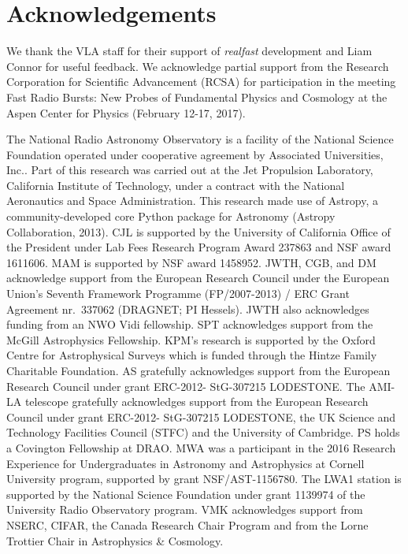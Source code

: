\documentclass[twocolumn]{aastex61}
\begin{document}
%


\section*{Acknowledgements}
We thank the VLA staff for their support of \textit{realfast} development and Liam Connor for useful feedback. We acknowledge partial support from the Research Corporation for Scientific Advancement (RCSA) for participation in the meeting Fast Radio Bursts: New Probes of Fundamental Physics and Cosmology at the Aspen Center for Physics (February 12-17, 2017).

The National Radio Astronomy Observatory is a facility of the National Science Foundation operated under cooperative agreement by Associated Universities, Inc..
Part of this research was carried out at the Jet Propulsion Laboratory, California Institute of Technology, under a contract with the National Aeronautics and Space Administration.
This research made use of Astropy, a community-developed core Python package for Astronomy (Astropy Collaboration, 2013).
CJL is supported by the University of California Office of the President under Lab Fees Research Program Award 237863 and NSF award 1611606. MAM is supported by NSF award 1458952. 
JWTH, CGB, and DM acknowledge support from the European Research Council under the European Union's Seventh Framework Programme (FP/2007-2013) / ERC Grant Agreement nr.\ 337062 (DRAGNET; PI Hessels). JWTH also acknowledges funding from an NWO Vidi fellowship.
SPT acknowledges support from the McGill Astrophysics Fellowship.
KPM's research is supported by the Oxford Centre for Astrophysical Surveys which is funded through the Hintze Family Charitable Foundation. AS gratefully acknowledges support from the European Research Council under grant ERC-2012- StG-307215 LODESTONE. The AMI-LA telescope gratefully acknowledges support from the European Research Council under grant ERC-2012- StG-307215 LODESTONE, the UK Science and Technology Facilities Council (STFC) and the University of Cambridge. 
PS holds a Covington Fellowship at DRAO. 
MWA was a participant in the 2016 Research Experience for Undergraduates in Astronomy and Astrophysics at Cornell University program, supported by grant NSF/AST-1156780.
The LWA1 station is supported by the National Science Foundation under grant 1139974 of the University Radio Observatory program.
VMK acknowledges support from NSERC, CIFAR, the Canada Research Chair Program and from the Lorne Trottier Chair in Astrophysics \& Cosmology.




\end{document}
